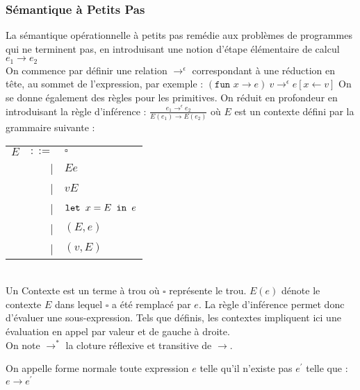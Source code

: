 \documentclass{cours}
\begin{document}
\subsubsection{Sémantique à Petits Pas}
La sémantique opérationnelle à petits pas remédie aux problèmes de programmes qui ne terminent pas, en introduisant une notion d'étape élémentaire de calcul $e_{1} \rightarrow e_{2}$\\
On commence par définir une relation $\rightarrow^{\epsilon}$ correspondant à une réduction en tête, au sommet de l'expression, par exemple : $(\texttt{fun } x\rightarrow e)\ v \rightarrow^{\epsilon} e[x \leftarrow v]$
On se donne également des règles pour les primitives. On réduit en profondeur en introduisant la règle d'inférence : $\frac{e_{1}\rightarrow^{\epsilon} e_{2}}{E(e_{1})\rightarrow E(e_{2})}$ où $E$ est un contexte défini par la grammaire suivante :
\begin{tabular}{crl}
    $E$ &$::=$& $\square$\\
    &|& $E e$\\
    &|& $v E$\\
    &|& $\texttt{let } x = E \texttt{ in } e$\\
    &|& $(E, e)$\\
    &|& $(v, E)$\\
\end{tabular}\\
Un Contexte est un terme à trou où $\square$ représente le trou. $E(e)$ dénote le contexte $E$ dans lequel $\square$ a été remplacé par $e$. La règle d'inférence permet donc d'évaluer une sous-expression. Tels que définis, les contextes impliquent ici une évaluation en appel par valeur et de gauche à droite. \\
On note $\rightarrow^{*}$ la cloture réflexive et transitive de $\rightarrow$.
\begin{definition}
    On appelle forme normale toute expression $e$ telle qu'il n'existe pas $e^{'}$ telle que : $e \rightarrow e^{'}$
\end{definition}
\end{document}
